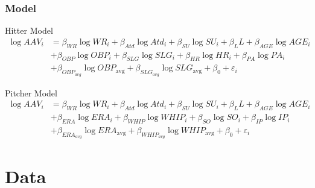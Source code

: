 \documentclass[9pt]{beamer}
\begin{document}
\begin{frame}
    \frametitle{Model}
    \begin{block}{Hitter Model}
        \begin{align*}
            \log{AAV_{i}} &= \beta_{WR} \log{WR_{i}}
                + \beta_{Atd} \log{Atd_{i}} 
                + \beta_{SU} \log{SU_{i}}
                + \beta_{L} L
                + \beta_{AGE}\log{AGE_{i}} \\
                &+ \beta_{OBP}\log{OBP_{i}}
                + \beta_{SLG}\log{SLG_{i}}
                + \beta_{HR}\log{HR_{i}}
                + \beta_{PA}\log{PA_{i}} \\
                &+ \beta_{OBP_{avg}}\log{OBP_{\text{avg}}}
                + \beta_{SLG_{avg}}\log{SLG_{\text{avg}}}
                + \beta_{0} 
                + \varepsilon_{i}
        \end{align*}
    \end{block}
    \begin{block}{Pitcher Model}
        \begin{align*}
            \log{AAV_{i}} &= \beta_{WR} \log{WR_{i}}
                + \beta_{Atd} \log{Atd_{i}} 
                + \beta_{SU} \log{SU_{i}}
                + \beta_{L} L
                + \beta_{AGE}\log{AGE_{i}} \\
                &+ \beta_{ERA}\log{ERA_{i}}
                + \beta_{WHIP}\log{WHIP_{i}}
                + \beta_{SO}\log{SO_{i}}
                + \beta_{IP}\log{IP_{i}} \\
                &+ \beta_{ERA_{avg}}\log{ERA_{\text{avg}}}
                + \beta_{WHIP_{avg}}\log{WHIP_{\text{avg}}}
                + \beta_{0} 
                + \varepsilon_{i}
        \end{align*}
    \end{block}
\end{frame}

\section{Data}
\end{document}
